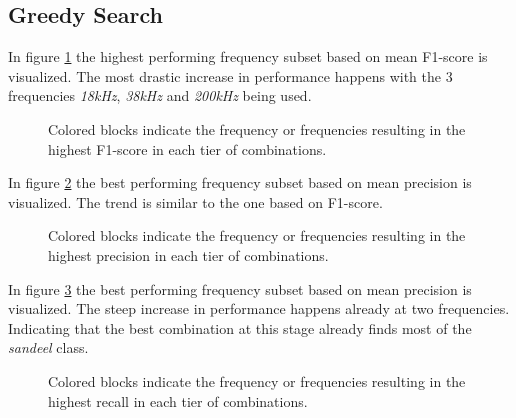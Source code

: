     
    
    \subsection{Greedy Search}
        In figure \ref{increasing_freq_f1_score_fig} the highest performing frequency subset based on mean F1-score is visualized. The most drastic increase in performance happens with the 3 frequencies \textit{18kHz}, \textit{38kHz} and \textit{200kHz} being used.
        \begin{figure}[H]
            \centering
            
            \caption[Best frequency combination - F1-score]{Colored blocks indicate the frequency or frequencies resulting in the highest F1-score in each tier of combinations.}
          	\medskip 
            \label{increasing_freq_f1_score_fig}
        \end{figure}

        In figure \ref{increasing_freq_precision_score_fig} the best performing frequency subset based on mean precision is visualized. The trend is similar to the one based on F1-score.
        \begin{figure}[H]
            \centering
            
            \caption[Best frequency combination - Precision]{Colored blocks indicate the frequency or frequencies resulting in the highest precision in each tier of combinations.}
          	\medskip 
            \label{increasing_freq_precision_score_fig}
        \end{figure}
        
        In figure \ref{increasing_freq_recall_score_fig} the best performing frequency subset based on mean precision is visualized. The steep increase in performance happens already at two frequencies. Indicating that the best combination at this stage already finds most of the \textit{sandeel} class.
        \begin{figure}[H]
            \centering
            
            \caption[Best frequency combination - Recall]{Colored blocks indicate the frequency or frequencies resulting in the highest recall in each tier of combinations.}
          	\medskip 
            \label{increasing_freq_recall_score_fig}
        \end{figure}

